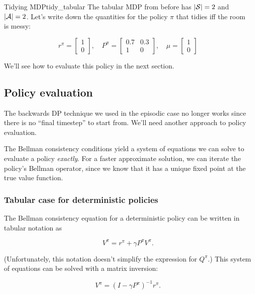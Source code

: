\documentclass[../main/main]{subfiles}
\begin{document}
\begin{example}{Tidying MDP}{tidy_tabular}
    The tabular MDP from before has $|\S| = 2$ and $|\A| = 2$. Let's write down the quantities for the policy $\pi$ that tidies iff the room is messy:

    \[
        r^{\pi} = \begin{bmatrix} 1 \\ 0 \end{bmatrix}, \quad
        P^{\pi} = \begin{bmatrix} 0.7 & 0.3 \\ 1 & 0 \end{bmatrix}, \quad
        \mu = \begin{bmatrix} 1 \\ 0 \end{bmatrix}
    \]

    We'll see how to evaluate this policy in the next section.
\end{example}

\subsection{Policy evaluation}

The backwards DP technique we used in the episodic case no longer works since there is no ``final timestep'' to start from. We'll need another approach to policy evaluation.

The Bellman consistency conditions yield a system of equations we can solve to evaluate a policy \emph{exactly}. For a faster approximate solution, we can iterate the policy's Bellman operator, since we know that it has a unique fixed point at the true value function.


\subsubsection{Tabular case for deterministic policies}

The Bellman consistency equation for a deterministic policy can be written in tabular notation as

\[
    V^\pi = r^\pi + \gamma P^\pi V^\pi.
\]

(Unfortunately, this notation doesn't simplify the expression for $Q^\pi$.) This system of equations can be solved with a matrix inversion:

\begin{equation}
    V^\pi = (I - \gamma P^\pi)^{-1} r^\pi. \label{eq:matrix_inversion_pe}
\end{equation}
\end{document}
